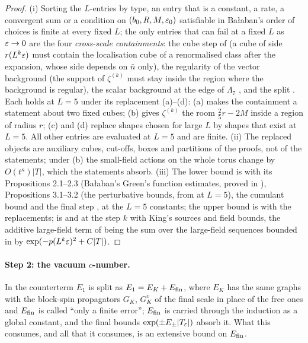 \begin{proof}
(i) Sorting the $L$-entries by type, an entry that is a constant, a rate, a convergent sum or a condition on $(b_0,R,M,\varepsilon_0)$ satisfiable in Ba{\l}aban's order of choices is finite at every fixed $L$; the only entries that can fail at a fixed $L$ as $\varepsilon\to0$ are the four \emph{cross-scale containments}: the cube step of \cite[p.~433]{Ba3} (a cube of side $r(L^k\varepsilon)$ must contain the localisation cube of a renormalised class after the expansion, whose side depends on $\bar n$ only), the regularity of the vector background \cite[Lemma~2.3]{Ba2} (the support of $\zeta^{(k)}$ must stay inside the region where the background is regular), the scalar background at the edge of $\Lambda_7$ \cite[Lemma~2.4]{Ba2}, and the split \cite[(2.89), p.~575]{Ba2}. Each holds at $L=5$ under its replacement (a)--(d): (a) makes the containment a statement about two fixed cubes; (b) gives $\zeta^{(k)}$ the room $\frac25r-2M$ inside a region of radius $r$; (c) and (d) replace shapes chosen for large $L$ by shapes that exist at $L=5$. All other entries are evaluated at $L=5$ and are finite. (ii) The replaced objects are auxiliary cubes, cut-offs, boxes and partitions of the proofs, not of the statements; under (b) the small-field actions on the whole torus change by $O(t^\kappa)|T|$, which the statements absorb. (iii) The lower bound \cite[(1.14)]{Ba1} is \cite[Sect.~3]{Ba1} with its Propositions 2.1--2.3 (Ba{\l}aban's Green's function estimates, proved in \cite{Ba4}), Propositions 3.1--3.2 (the perturbative bounds, from \cite[Prop.~1]{Ba3} at $L=5$), the cumulant bound and the final step \cite[(3.66)--(3.69)]{Ba1}, at the $L=5$ constants; the upper bound \cite[(1.3)]{Ba2} is \cite[Sects.~2--3]{Ba2} with the replacements; \cite[Thm.~3.1]{K1} is \cite[(3.26)]{Ba1} and \cite[(2.43), (2.117)]{Ba2} at the step $k$ with King's sources and field bounds, the additive large-field term of \cite[(3.4)]{K1} being the sum over the large-field sequences bounded in \cite[Sect.~3]{Ba2} by $\exp(-p(L^k\varepsilon)^2+C|T|)$.
\end{proof}

\paragraph{Step 2: the vacuum $c$-number.} In \cite[(1.26)--(1.30), p.~418]{Ba3} the counterterm $E_1$ is split as $E_1=E_K+E_{\mathrm{fin}}$, where $E_K$ has the same graphs with the block-spin propagators $G_K$, $G^v_K$ of the final scale in place of the free ones and $E_{\mathrm{fin}}$ is called ``only a finite error''; $E_{\mathrm{fin}}$ is carried through the induction as a global constant, and the final bounds $\exp(\pm E_\pm|T_{\varepsilon}|)$ absorb it. What this consumes, and all that it consumes, is an extensive bound on $E_{\mathrm{fin}}$.

